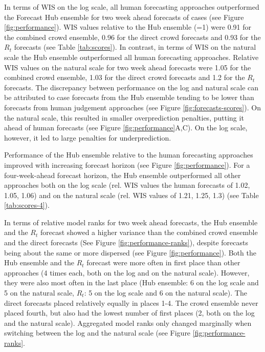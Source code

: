 \documentclass[10pt,a4paper,twocolumn]{article}
\begin{document}
In terms of WIS on the log scale, all human forecasting approaches outperformed the Forecast Hub ensemble for two week ahead forecasts of cases (see Figure \ref{fig:performance}). WIS values relative to the Hub ensemble (=1) were 0.91 for the combined crowd ensemble, 0.96 for the direct crowd forecasts and 0.93 for the $R_t$ forecasts (see Table \ref{tab:scores}). In contrast, in terms of WIS on the natural scale the Hub ensemble outperformed all human forecasting approaches. Relative WIS values on the natural scale for two week ahead forecasts were 1.05 for the combined crowd ensemble, 1.03 for the direct crowd forecasts and 1.2 for the $R_t$ forecasts. 
The discrepancy between performance on the log and natural scale  can be attributed to case forecasts from the Hub ensemble tending to be lower than forecasts from human judgement approaches (see Figure \ref{fig:forecasts-scores}). On the natural scale, this resulted in smaller overprediction penalties, putting it ahead of human forecasts (see Figure \ref{fig:performance}A,C). On the log scale, however, it led to large penalties for underprediction. 



Performance of the Hub ensemble relative to the human forecasting approaches improved with increasing forecast horizon (see Figure \ref{fig:performance}). For a four-week-ahead forecast horizon, the Hub ensemble outperformed all other approaches both on the log scale (rel. WIS values the human forecasts of 1.02, 1.05, 1.06) and on the natural scale (rel. WIS values of 1.21, 1.25, 1.3) (see Table \ref{tab:scores-4}). 

In terms of relative model ranks for two week ahead forecasts, the Hub ensemble and the $R_t$ forecast showed a higher variance than the combined crowd ensemble and the direct forecasts (See Figure \ref{fig:performance-ranks}), despite forecasts being about the same or more dispersed (see Figure \ref{fig:performance}). Both the Hub ensemble and the $R_t$ forecast were more often in first place than other approaches (4 times each, both on the log and on the natural scale). However, they were also most often in the last place (Hub ensemble: 6 on the log scale and 5 on the natural scale, $R_t$: 5 on the log scale and 6 on the natural scale). The direct forecasts placed relatively equally in places 1-4. The crowd ensemble never placed fourth, but also had the lowest number of first places (2, both on the log and the natural scale). Aggregated model ranks only changed marginally when switching between the log and the natural scale (see Figure \ref{fig:performance-ranks}. 
\end{document}
